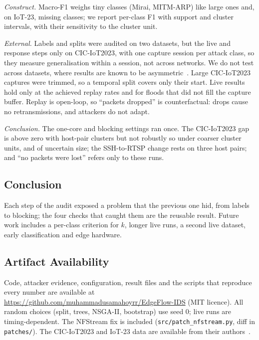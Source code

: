 \emph{Construct.} Macro-F1 weighs tiny classes (Mirai, MITM-ARP) like large ones and, on IoT-23, missing classes; we report per-class F1 with support and cluster intervals, with their sensitivity to the cluster unit.

\emph{External.} Labels and splits were audited on two datasets, but the live and response steps only on CIC-IoT2023, with one capture session per attack class, so they measure generalisation within a session, not across networks. We do not test across datasets, where results are known to be asymmetric~\cite{ali2026siamxbert}. Large CIC-IoT2023 captures were trimmed, so a temporal split covers only their start. Live results hold only at the achieved replay rates and for floods that did not fill the capture buffer. Replay is open-loop, so ``packets dropped'' is counterfactual: drops cause no retransmissions, and attackers do not adapt.

\emph{Conclusion.} The one-core and blocking settings ran once. The CIC-IoT2023 gap is above zero with host-pair clusters but not robustly so under coarser cluster units, and of uncertain size; the SSH-to-RTSP change rests on three host pairs; and ``no packets were lost'' refers only to these runs.

\subsection{Conclusion}

Each step of the audit exposed a problem that the previous one hid, from labels to blocking; the four checks that caught them are the reusable result. Future work includes a per-class criterion for $k$, longer live runs, a second live dataset, early classification and edge hardware.

\subsection{Artifact Availability}

Code, attacker evidence, configuration, result files and the scripts that reproduce every number are available at \url{https://github.com/muhammadusamahoyrr/EdgeFlow-IDS} (MIT licence). All random choices (split, trees, NSGA-II, bootstrap) use seed 0; live runs are timing-dependent. The NFStream fix is included (\nolinkurl{src/patch_nfstream.py}, diff in \nolinkurl{patches/}).
The CIC-IoT2023 and IoT-23 data are available from their authors~\cite{neto2023ciciot2023,garcia2020iot23}.
